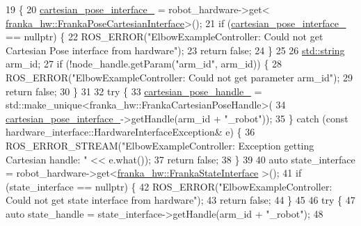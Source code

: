 \begin{DoxyCode}
19                                                               \{
20   \hyperlink{classfranka__example__controllers_1_1ElbowExampleController_a77b32f28520c2db59b4fd7209c50d578}{cartesian\_pose\_interface\_} = robot\_hardware->get<
      \hyperlink{classfranka__hw_1_1FrankaPoseCartesianInterface}{franka\_hw::FrankaPoseCartesianInterface}>();
21   \textcolor{keywordflow}{if} (\hyperlink{classfranka__example__controllers_1_1ElbowExampleController_a77b32f28520c2db59b4fd7209c50d578}{cartesian\_pose\_interface\_} == \textcolor{keyword}{nullptr}) \{
22     ROS\_ERROR(\textcolor{stringliteral}{"ElbowExampleController: Could not get Cartesian Pose interface from hardware"});
23     \textcolor{keywordflow}{return} \textcolor{keyword}{false};
24   \}
25 
26   \hyperlink{namespacetesting_1_1internal_a8e8ff5b11e64078831112677156cb111}{std::string} arm\_id;
27   \textcolor{keywordflow}{if} (!node\_handle.getParam(\textcolor{stringliteral}{"arm\_id"}, arm\_id)) \{
28     ROS\_ERROR(\textcolor{stringliteral}{"ElbowExampleController: Could not get parameter arm\_id"});
29     \textcolor{keywordflow}{return} \textcolor{keyword}{false};
30   \}
31 
32   \textcolor{keywordflow}{try} \{
33     \hyperlink{classfranka__example__controllers_1_1ElbowExampleController_a911a7a82e55ba8f023ec8c0a9c8d2bd9}{cartesian\_pose\_handle\_} = std::make\_unique<franka\_hw::FrankaCartesianPoseHandle>(
34         \hyperlink{classfranka__example__controllers_1_1ElbowExampleController_a77b32f28520c2db59b4fd7209c50d578}{cartesian\_pose\_interface\_}->getHandle(arm\_id + \textcolor{stringliteral}{"\_robot"}));
35   \} \textcolor{keywordflow}{catch} (\textcolor{keyword}{const} hardware\_interface::HardwareInterfaceException& e) \{
36     ROS\_ERROR\_STREAM(\textcolor{stringliteral}{"ElbowExampleController: Exception getting Cartesian handle: "} << e.what());
37     \textcolor{keywordflow}{return} \textcolor{keyword}{false};
38   \}
39 
40   \textcolor{keyword}{auto} state\_interface = robot\_hardware->get<\hyperlink{classfranka__hw_1_1FrankaStateInterface}{franka\_hw::FrankaStateInterface}
      >();
41   \textcolor{keywordflow}{if} (state\_interface == \textcolor{keyword}{nullptr}) \{
42     ROS\_ERROR(\textcolor{stringliteral}{"ElbowExampleController: Could not get state interface from hardware"});
43     \textcolor{keywordflow}{return} \textcolor{keyword}{false};
44   \}
45 
46   \textcolor{keywordflow}{try} \{
47     \textcolor{keyword}{auto} state\_handle = state\_interface->getHandle(arm\_id + \textcolor{stringliteral}{"\_robot"});
48 

\end{DoxyCode}
